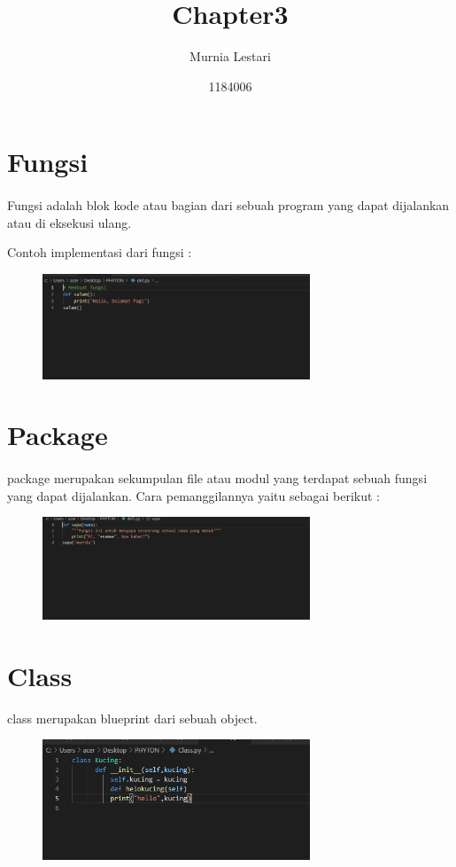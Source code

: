 \documentclass{article}
\title{Chapter3}
\author{Murnia Lestari }
\date{1184006}
\begin{document}
\maketitle
\section{Fungsi}
\paragraph{}
Fungsi adalah blok kode atau bagian dari sebuah program yang dapat dijalankan atau di eksekusi ulang.
\par Contoh implementasi dari fungsi :
\begin{figure}[h]
\centerline{\includegraphics[width=8cm]{figure/satu.PNG}}
\end{figure}

\section{Package}
\paragraph{}
package merupakan sekumpulan file atau modul yang terdapat sebuah fungsi yang dapat dijalankan. Cara pemanggilannya yaitu sebagai berikut :
\begin{figure}[h]
\centerline{\includegraphics[width=8cm]{figure/2.PNG}}
\end{figure}

\section{Class}
class merupakan blueprint dari sebuah object.
\begin{figure}[h]
\centerline{\includegraphics[width=8cm]{figure/a.PNG}}
\end{figure}
\end{document}
